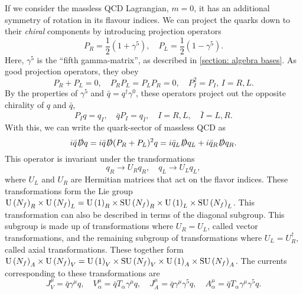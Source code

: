 If we consider the massless QCD Lagrangian, $m = 0$, it has an additional symmetry of rotation in its flavour indices.
We can project the quarks down to their \emph{chiral} components by introducing projection operators
\begin{equation}
    P_R = \frac{1}{2}\left(1 + \gamma^5\right), \quad
    P_L = \frac{1}{2}\left(1 - \gamma^5\right).
\end{equation}
%
Here, $\gamma^5$ is the ``fifth gamma-matrix'', as described in \autoref{section: algebra bases}.
As good projection operators, they obey
%
\begin{equation}
    P_R + P_L = 0, \quad P_R P_L = P_L P_R = 0, \quad P_I^2 = P_I, \, I=R, L.
\end{equation}
%
By the properties of $\gamma^5$ and $\bar q = q^\dagger\gamma^0$, these operators project out the opposite chirality of $q$ and $\bar q$,
%
\begin{equation}
    P_I q = q_I, \quad \bar q  P_I  = q_{\bar I},\quad
    I = R, L, \quad \bar I = L, R. 
\end{equation}
%
With this, we can write the quark-sector of massless QCD as
%
\begin{equation}
    i \bar q \slashed D q
    = i \bar q \slashed D (P_R + P_L)^2 q
    = i \bar q_L \slashed D q_L + i \bar q_R \slashed D q_R.
\end{equation}
%
This operator is invariant under the transformations
%
\begin{equation}
    q_R \rightarrow U_R q_R, \quad
    q_L \rightarrow U_L q_L,
\end{equation}
%
where $U_L$ and $U_R$ are Hermitian matrices that act on the flavor indices.
These transformations form the Lie group $\text{U}\left(N_f\right)_R \times \text{U}\left(N_f\right)_L = \text{U}\left(1\right)_R \times \text{SU}\left(N_f\right)_R \times \text{U}\left(1\right)_L \times \text{SU}\left(N_f\right)_L $.
This transformation can also be described in terms of the diagonal subgroup.
This subgroup is made up of transformations where $U_R = U_L$, called vector transformations, and the remaining subgroup of transformations where $U_L =  U_R^\dagger$, called axial transformations.
These together form $\text{U}\left(N_f\right)_A \times \text{U}\left(N_f\right)_V= \text{U}\left(1\right)_V \times \text{SU}\left(N_f\right)_V \times \text{U}\left(1\right)_A \times \text{SU}\left(N_f\right)_A $.
The currents corresponding to these transformations are
%
\begin{equation}
    \label{conserved currents qcd}
    J_V^\mu = \bar q \gamma^\mu q, \quad
    V^\mu_\alpha =  \bar q T_\alpha \gamma^\mu q, \quad
    J_A^\mu = \bar q \gamma^\mu \gamma^5 q, \quad
    A^\mu_\alpha = \bar q T_\alpha \gamma^\mu \gamma^5 q.
\end{equation}
